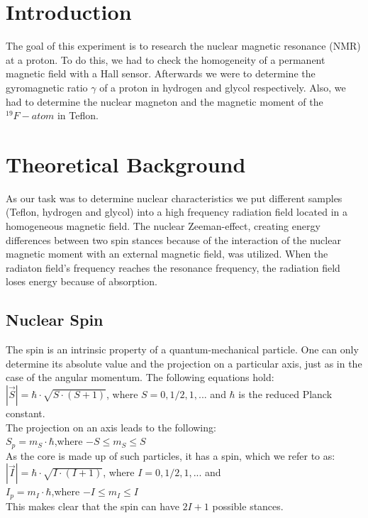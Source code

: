 \section{Introduction}
The goal of this experiment is to research the nuclear magnetic resonance (NMR) at a proton. To do this, we had to check the homogeneity of a permanent magnetic field with a Hall sensor. Afterwards we were to determine the gyromagnetic ratio $\gamma$ of a proton in hydrogen and glycol respectively. Also, we had to determine the nuclear magneton and the magnetic moment of the $^{19}F-atom$ in Teflon.\\
\section{Theoretical Background}
As our task was to determine nuclear characteristics we put different samples (Teflon, hydrogen and glycol) into a high frequency radiation field located in a homogeneous magnetic field. The nuclear Zeeman-effect, creating energy differences between two spin stances because of the interaction of the nuclear magnetic moment with an external magnetic field, was utilized. When the radiaton field's frequency reaches the resonance frequency, the radiation field loses energy because of absorption.
\subsection{Nuclear Spin}
The spin is an intrinsic property of a quantum-mechanical particle. One can only determine its absolute value and the projection on a particular axis, just as in the case of the angular momentum. The following equations hold:\\
$\left\vert{\vec{S}}\right\vert=\hbar\cdot\sqrt{S\cdot(S+1)}$, where $S=0,1/2,1,...$ and $\hbar$ is the reduced Planck constant.\\
The projection on an axis leads to the following:\\
$S_{p}=m_{S}\cdot\hbar$,where $-S\leq m_{S} \leq S$\\
As the core is made up of such particles, it has a spin, which we refer to as:\\
$\left\vert{\vec{I}}\right\vert=\hbar\cdot\sqrt{I\cdot(I+1)}$, where $I=0,1/2,1,...$ and \\
$I_{p}=m_{I}\cdot\hbar$,where $-I\leq m_{I} \leq I$\\
This makes clear that the spin can have $2I+1$ possible stances.
